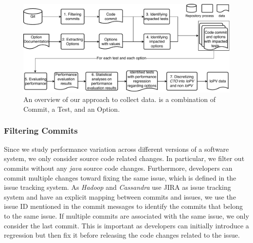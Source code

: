 \begin{figure}[t]
	\centering
		\includegraphics[width=.9\textwidth]{Figures/overview.pdf}
	\caption{An overview of our approach to collect data. \instance is a combination of Commit, a Test, and an Option.} %
	\label{fig:overview} 
\end{figure}

\subsubsection{Filtering Commits}

Since we study performance variation across different versions of a software system, we only consider source code related changes. In particular, we filter out commits without any \emph{java} source code changes. %
Furthermore, %
developers can commit multiple changes toward fixing the same issue, which is defined in the issue tracking system. As \emph{Hadoop} and \emph{Cassandra} use JIRA as issue tracking system and have an explicit mapping between commits and issues, we use the issue ID mentioned in the commit messages to identify the commits that belong to the same issue. If multiple commits are associated with the same issue, we only consider the last commit. This is important as developers can initially introduce a regression but then fix it before releasing the code changes related to the issue. %



